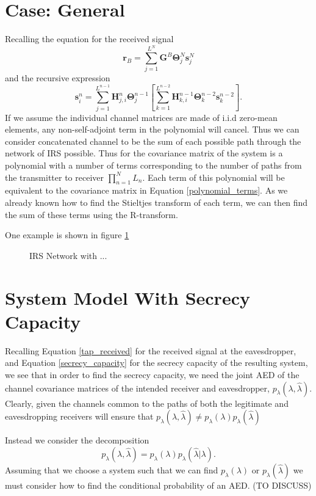 \documentclass[12pt,a4paper]{report}
\begin{document}
\section{Case: General} 
Recalling the equation for the received signal
	\begin{equation*}
\mathbf{r}_{B} = \sum_{j = 1}^{L^{N}}\mathbf{G}^{B}\boldsymbol{\Theta}^{N}_{j}\mathbf{s}^{N}_{j}
\end{equation*}
and the recursive expression 
\begin{equation*}
\mathbf{s}^{n}_{i} = \sum_{j = 1}^{L^{n-1}}  \mathbf{H}^{n}_{j,i}\boldsymbol{\Theta}^{n-1}_{j} \left[
\sum_{k = 1}^{L^{n-2}}  \mathbf{H}^{n-1}_{k,i}\boldsymbol{\Theta}^{n-2}_{k}\mathbf{s}^{n-2}_{k} \right].
\end{equation*}
If we assume the individual channel matrices are made of i.i.d zero-mean elements, any non-self-adjoint term in the polynomial will cancel. Thus we can consider concatenated channel to be the sum of each possible path through the network of IRS possible. Thus for the covariance matrix of the system is a polynomial with a number of terms corresponding to the number of paths from the transmitter to receiver
$\prod_{n=1}^{N} L_n$. Each term of this polynomial will be equivalent to the covariance matrix in Equation \eqref{polynomial_terms}. As we already known how to find the Stieltjes transform of each term, we can then find the sum of these terms using the R-transform. 
\par
One example is shown in figure \ref{irs_figure}


\begin{figure}

\caption{IRS Network with ...}
\label{irs_figure}
\end{figure}


\section{System Model With Secrecy Capacity}
Recalling Equation \eqref{tap_received} for the received signal at the eavesdropper,  and Equation \eqref{secrecy_capacity} for the secrecy capacity of the resulting system, we see that in order to find the secrecy capacity, we need the joint AED of the channel covariance matrices of the intended receiver and eavesdropper, $p_{\lambda}(\lambda,\hat{\lambda})$. Clearly, given the channels common to the paths of both the legitimate and eavesdropping receivers will ensure that $p_{\lambda}(\lambda,\hat{\lambda}) \neq p_{\lambda}(\lambda)p_{\lambda}(\hat{\lambda})$
\par
Instead we consider the decomposition 
\begin{equation}
p_{\lambda}(\lambda,\hat{\lambda}) = p_{\lambda}(\lambda)p_{\lambda}(\hat{\lambda}|\lambda).
\end{equation}
Assuming that we choose a system such that we can find $ p_{\lambda}(\lambda)$ or  $p_{\lambda}(\hat{\lambda})$ we must consider how to find the conditional probability of an AED. (TO DISCUSS)
\end{document}
